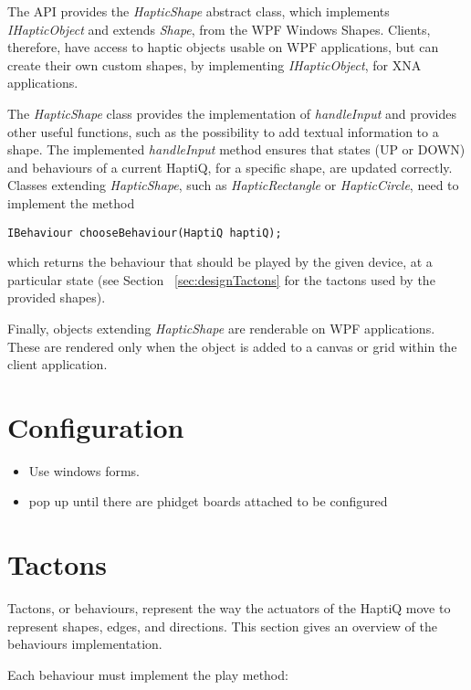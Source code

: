 The API provides the \textit{HapticShape} abstract class, which implements \textit{IHapticObject} and extends \textit{Shape}, from the WPF Windows Shapes. Clients, therefore, have access to haptic objects usable on WPF applications, but can create their own custom shapes, by implementing \textit{IHapticObject}, for XNA applications. 

The \textit{HapticShape} class provides the implementation of \textit{handleInput} and provides other useful functions, such as the possibility to add textual information to a shape. The implemented \textit{handleInput} method ensures that states (UP or DOWN) and behaviours of a current HaptiQ, for a specific shape, are updated correctly. Classes extending \textit{HapticShape}, such as \textit{HapticRectangle} or \textit{HapticCircle}, need to implement the method

\lstset{style=sharpc1}
\begin{lstlisting}
IBehaviour chooseBehaviour(HaptiQ haptiQ);
\end{lstlisting}

which returns the behaviour that should be played by the given device, at a particular state (see Section ~\ref{sec:designTactons} for the tactons used by the provided shapes).

Finally, objects extending \textit{HapticShape} are renderable on WPF applications. These are rendered only when the object is added to a canvas or grid within the client application.

\section{Configuration}
\label{sec:configuration}

\begin{itemize}
\item Use windows forms.
\item pop up until there are phidget boards attached to be configured
\end{itemize}

\section{Tactons}

Tactons, or behaviours, represent the way the actuators of the HaptiQ move to represent shapes, edges, and directions. This section gives an overview of the behaviours implementation.

Each behaviour must implement the play method:

